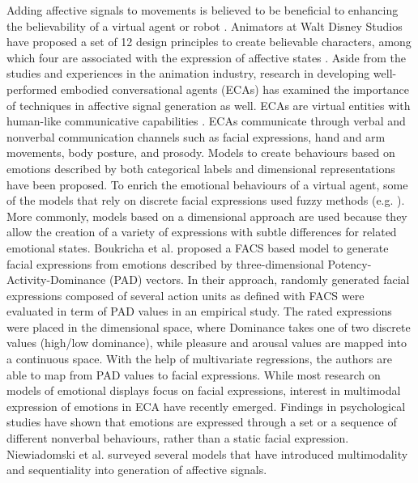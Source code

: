 Adding affective signals to movements is believed to be beneficial to enhancing the believability of a virtual agent or robot \cite{lasseter1987principles}. Animators at Walt Disney Studios have proposed a set of 12 design principles to create believable characters, among which four are associated with the expression of affective states \cite{lasseter1987principles, kerlow2004art}. Aside from the studies and experiences in the animation industry, research in developing well-performed embodied conversational agents (ECAs) has examined the importance of techniques in affective signal generation as well. ECAs are virtual entities with human-like communicative capabilities \cite{cassell2000embodied, niewiadomski2013computational}. ECAs communicate through verbal and nonverbal communication channels such as facial expressions, hand and arm movements, body posture, and prosody. Models to create behaviours based on emotions described by both categorical labels and dimensional representations have been proposed. To enrich the emotional behaviours of a virtual agent, some of the models that rely on discrete facial expressions used fuzzy methods (e.g. \cite{bui2004creating}). More commonly, models based on a dimensional approach are used because they allow the creation of a variety of expressions with subtle differences for related emotional states. Boukricha et al. \cite{boukricha2009pleasure} proposed a FACS \cite{ekm02} based model to generate facial expressions from emotions described by three-dimensional Potency-Activity-Dominance (PAD) vectors. In their approach, randomly generated facial expressions composed of several action units as defined with FACS were evaluated in term of PAD values in an empirical study. The rated expressions were placed in the dimensional space, where Dominance takes one of two discrete values (high/low dominance), while pleasure and arousal values are mapped into a continuous space. With the help of multivariate regressions, the authors are able to map from PAD values to facial expressions. While most research on models of emotional displays focus on facial expressions, interest in multimodal expression of emotions in ECA have recently emerged. Findings in psychological studies have shown that emotions are expressed through a set or a sequence of different nonverbal behaviours, rather than a static facial expression. Niewiadomski et al. \cite{niewiadomski2013computational} surveyed several models that have introduced multimodality and sequentiality into generation of affective signals.

